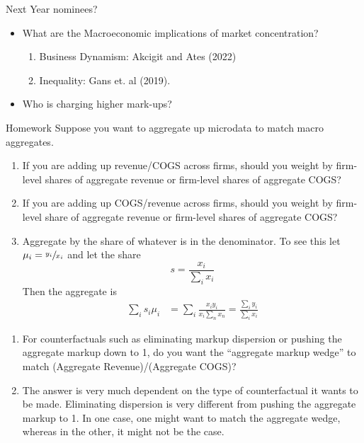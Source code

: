 \documentclass[usenames,dvipsnames,aspectratio=169]{beamer}
\begin{document}
\begin{frame}{Next Year nominees?} 
    \begin{itemize}[label=\textcolor{teal}{$\blacktriangleright$}]
        \item What are the Macroeconomic implications of market concentration? 
        \begin{enumerate}[label=\textbf{\textcolor{teal}{\arabic*.}}]
            \item Business Dynamism: Akcigit and Ates (2022)
            \item Inequality: Gans et. al (2019). 
        \end{enumerate}
        \item Who is charging higher mark-ups? 
    \end{itemize}
\end{frame}

\begin{frame}[allowframebreaks]{Homework}
Suppose you want to aggregate up microdata to match macro aggregates. 
\begin{enumerate}[label=\textbf{\textcolor{teal}{(\arabic*)}},leftmargin=*]
    \item If you are adding up revenue/COGS across firms, should you weight by firm-level shares of aggregate revenue or firm-level shares of aggregate COGS? 
    \item If you are adding up COGS/revenue across firms, should you weight by firm-level share of aggregate revenue or firm-level shares of aggregate COGS? 
    \vfill
    \item[\textbf{\textcolor{teal}{(S)}}] Aggregate by the share of whatever is in the denominator. To see this let $\mu_i = \sfrac{y_i}{x_i}$ and let the share 
    \begin{equation*}
        s = \frac{x_i}{\sum_{i}x_i}
    \end{equation*}
    Then the aggregate is
    \begin{align*}
        \sum_{i} s_i\mu_i &= \sum_i \frac{x_iy_i}{x_i\sum_nx_n} = \frac{\sum_i y_i }{\sum_i x_i}
    \end{align*}
\end{enumerate}
\break
\begin{enumerate}[resume*]
    \item For counterfactuals such as eliminating markup dispersion or pushing the aggregate markup down to 1, do you want the ``aggregate markup wedge'' to match (Aggregate Revenue)/(Aggregate COGS)?
    \item[\textbf{\textcolor{teal}{(S)}}] The answer is very much dependent on the type of counterfactual it wants to be made. Eliminating dispersion is very different from pushing the aggregate markup to 1. In one case, one might want to match the aggregate wedge, whereas in the other, it might not be the case.  
\end{enumerate}

\end{frame}
\end{document}
